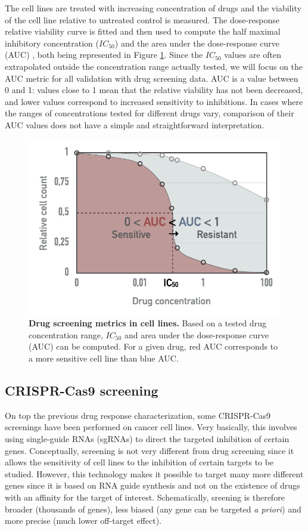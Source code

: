 \documentclass[a4paper,12pt,twoside,onecolumn,openright,final,oldfontcommands]{memoir}
\begin{document}
The cell lines are treated with increasing concentration of drugs and
the viability of the cell line relative to untreated control is
measured. The dose-response relative viability curve is fitted and then
used to compute the half maximal inhibitory concentration (\(IC_{50}\))
and the area under the dose-response curve (AUC)
\citep{vis2016multilevel}, both being represented in Figure
\ref{fig:AUC}. Since the \(IC_{50}\) values are often extrapolated
outside the concentration range actually tested, we will focus on the
AUC metric for all validation with drug screening data. AUC is a value
between 0 and 1: values close to 1 mean that the relative viability has
not been decreased, and lower values correspond to increased sensitivity
to inhibitions. In cases where the ranges of concentrations tested for
different drugs vary, comparison of their AUC values does not have a
simple and straightforward interpretation.

\begin{figure}

{\centering \includegraphics[width=0.5\linewidth]{fig/AUC} 

}

\caption[Drug screening metrics in cell lines]{\textbf{Drug screening metrics in cell lines.} Based
on a tested drug concentration range, \(IC_{50}\) and area under the
dose-response curve (AUC) can be computed. For a given drug, red AUC
corresponds to a more sensitive cell line than blue AUC.}\label{fig:AUC}
\end{figure}






\subsection{CRISPR-Cas9 screening}\label{appendix-CRISPR}

On top the previous drug response characterization, some CRISPR-Cas9
screenings have been performed on cancer cell lines. Very basically,
this involves using single-guide RNAs (sgRNAs) to direct the targeted
inhibition of certain genes. Conceptually, screening is not very
different from drug screening since it allows the sensitivity of cell
lines to the inhibition of certain targets to be studied. However, this
technology makes it possible to target many more different genes since
it is based on RNA guide synthesis and not on the existence of drugs
with an affinity for the target of interest. Schematically, sreening is
therefore broader (thousands of genes), less biased (any gene can be
targeted \emph{a priori}) and more precise (much lower off-target
effect).
\end{document}

